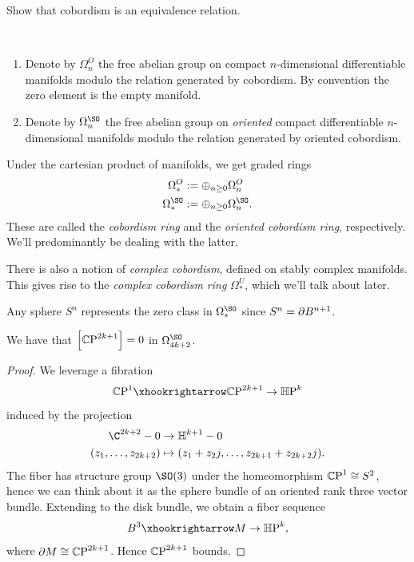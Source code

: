 \documentclass[11pt]{book}
\begin{document}
\begin{exercise} Show that cobordism is an equivalence relation.
\end{exercise}

\begin{definition}\label{def:cobordism-ring} \,
\begin{enumerate}
    \item Denote by $\Omega^O_n$ the free abelian group on compact $n$-dimensional differentiable manifolds modulo the relation generated by cobordism. By convention the zero element is the empty manifold.
    \item Denote by $\Omega^{\SO}_n$ the free abelian group on \emph{oriented} compact differentiable $n$-dimensional manifolds modulo the relation generated by oriented cobordism.
\end{enumerate}
\end{definition}

\begin{proposition} Under the cartesian product of manifolds, we get graded rings
\begin{align*}
    \Omega^O_\ast &:= \oplus_{n\ge0} \Omega^O_n \\
    \Omega^\SO_\ast &:= \oplus_{n\ge0} \Omega^\SO_n.
\end{align*}
These are called the \emph{cobordism ring} and the \emph{oriented cobordism ring}, respectively. We'll predominantly be dealing with the latter.
\end{proposition}


\begin{remark} There is also a notion of \emph{complex cobordism}, defined on stably complex manifolds. This gives rise to the \emph{complex cobordism ring} $\Omega^U_\ast$, which we'll talk about later.
\end{remark}

\begin{example} Any sphere $S^n$ represents the zero class in $\Omega^\SO_\ast$ since $S^n = \partial B^{n+1}$.
\end{example}

\begin{proposition} We have that $\left[ {\mathbb{C}\text{P}}^{2k+1} \right]=0$ in $\Omega^{\SO}_{4k+2}$.
\end{proposition}
\begin{proof} We leverage a fibration
\begin{align*}
    \CP^1 \hookto \CP^{2k+1} \to \HP^k
\end{align*}
induced by the projection
\begin{align*}
    \C^{2k+2}-0 &\to \mathbb{H}^{k+1}-0 \\
    (z_1, \ldots, z_{2k+2}) &\mapsto (z_1 + z_2j, \ldots, z_{2k+1}+z_{2k+2}j).
\end{align*}
The fiber has structure group $\SO(3)$ under the homeomorphism ${\mathbb{C}\text{P}}^1 \cong S^2$, hence we can think about it as the sphere bundle of an oriented rank three vector bundle. Extending to the disk bundle, we obtain a fiber sequence
\begin{align*}
    B^3 \hookto M \to \HP^k,
\end{align*}
where $\partial M \cong {\mathbb{C}\text{P}}^{2k+1}$. Hence ${\mathbb{C}\text{P}}^{2k+1}$ bounds.
\end{proof}
\end{document}
